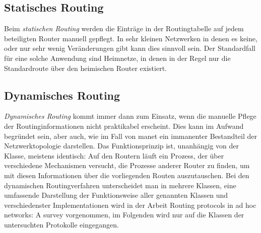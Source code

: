 \subsection{Statisches Routing}
\label{chapter:grundlagen:routing-static}

Beim \textit{statischen Routing} werden die Einträge in der Routingtabelle auf jedem beteiligten Router manuell gepflegt. In sehr kleinen Netzwerken in denen es keine, oder nur sehr wenig Veränderungen gibt kann dies sinnvoll sein. Der Standardfall für eine solche Anwendung sind Heimnetze, in denen in der Regel nur die Standardroute über den heimischen Router existiert.


\subsection{Dynamisches Routing}
\label{chapter:grundlagen:routing-dynamic:pro}

\textit{Dynamisches Routing} kommt immer dann zum Einsatz, wenn die manuelle Pflege der Routinginformationen nicht praktikabel erscheint. Dies kann im Aufwand begründet sein, aber auch, wie im Fall von \gls{manet} ein immanenter Bestandteil der Netzwerktopologie darstellen. Das Funktionsprinzip ist, unanhängig von der Klasse, meistens identisch: Auf den Routern läuft ein Prozess, der über verschiedene Mechanismen versucht, die Prozesse anderer Router zu finden, um mit diesen Informationen über die vorliegenden Routen auszutauschen. Bei den dynamischen Routingverfahren unterscheidet man in mehrere Klassen, eine umfassende Darstellung der Funktionsweise aller genannten Klassen und verschiedenster Implementationen wird in der Arbeit \glqq{}Routing protocols in ad hoc networks: A survey\grqq \cite{Azzedine11} vorgenommen, im Folgenden wird nur auf die Klassen der untersuchten Protokolle eingegangen.

